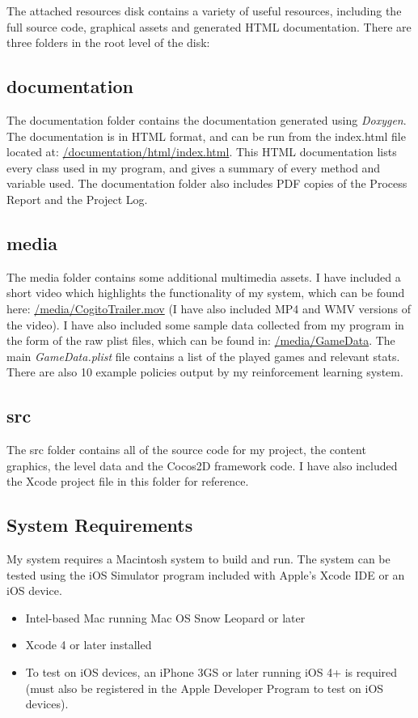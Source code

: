 \documentclass[a4paper,oneside]{report}
\begin{document}
The attached resources disk contains a variety of useful resources, including the full source code, graphical assets and generated HTML documentation. There are three folders in the root level of the disk: 

\subsection{documentation} The documentation folder contains the documentation generated using \emph{Doxygen}. The documentation is in HTML format, and can be run from the index.html file located at: \url{/documentation/html/index.html}. This HTML documentation lists every class used in my program, and gives a summary of every method and variable used. The documentation folder also includes PDF copies of the Process Report and the Project Log.

\subsection{media} The media folder contains some additional multimedia assets. I have included a short video which highlights the functionality of my system, which can be found here: \url{/media/CogitoTrailer.mov} (I have also included MP4 and WMV versions of the video). I have also included some sample data collected from my program in the form of the raw plist files, which can be found in: \url{/media/GameData}. The main \emph{GameData.plist} file contains a list of the played games and relevant stats. There are also 10 example policies output by my reinforcement learning system. 

\subsection{src} The src folder contains all of the source code for my project, the content graphics, the level data and the Cocos2D framework code. I have also included the Xcode project file in this folder for reference.

\subsection{System Requirements}

My system requires a Macintosh system to build and run. The system can be tested using the iOS Simulator program included with Apple's Xcode IDE or an iOS device.

\begin{itemize}
	\item Intel-based Mac running Mac OS Snow Leopard or later
	\item Xcode 4 or later installed
	\item To test on iOS devices, an iPhone 3GS or later running iOS 4+ is required (must also be registered in the Apple Developer Program to test on iOS devices).
\end{itemize}
\end{document}
